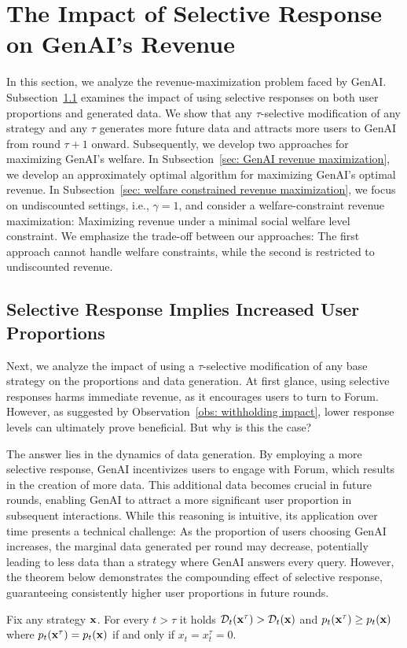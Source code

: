 \section{The Impact of Selective Response on GenAI's Revenue} \label{sec: genai effect}
In this section, we analyze the revenue-maximization problem faced by GenAI. Subsection~\ref{subsec:impact} examines the impact of using selective responses on both user proportions and generated data. We show that
any $\tau$-selective modification of any strategy and any $\tau$ generates more future data and attracts more users to GenAI from round $\tau+1$ onward. Subsequently, we develop two approaches for maximizing GenAI's welfare. In Subsection~\ref{sec: GenAI revenue maximization}, we develop an approximately optimal algorithm for maximizing GenAI's optimal revenue. In Subsection~\ref{sec: welfare constrained revenue maximization}, we focus on undiscounted settings, i.e., $\gamma=1$, and consider a welfare-constraint revenue maximization: Maximizing revenue under a minimal social welfare level constraint. We emphasize the trade-off between our approaches: The first approach cannot handle welfare constraints, while the second is restricted to undiscounted revenue. %

\subsection{Selective Response Implies Increased User Proportions}\label{subsec:impact}
Next, we analyze the impact of using a $\tau$-selective modification of any base strategy on the proportions and data generation. At first glance, using selective responses harms immediate revenue, as it encourages users to turn to Forum. However, as suggested by Observation~\ref{obs: withholding impact}, lower response levels can ultimately prove beneficial. But why is this the case?

The answer lies in the dynamics of data generation. By employing a more selective response, GenAI incentivizes users to engage with Forum, which results in the creation of more data. This additional data becomes crucial in future rounds, enabling GenAI to attract a more significant user proportion in subsequent interactions. While this reasoning is intuitive, its application over time presents a technical challenge: As the proportion of users choosing GenAI increases, the marginal data generated per round may decrease, potentially leading to less data than a strategy where GenAI answers every query. However, the theorem below demonstrates the compounding effect of selective response, guaranteeing consistently higher user proportions in future rounds.
\begin{theorem} \label{thm: not answering increase proportions}
Fix any strategy ${\bf{x}}$. For every $t > \tau$ it holds $\mathcal{D}_t({\bf{x}}^\tau) > \mathcal{D}_t({\bf{x}})$ and $p_t({\bf{x}}^\tau) \geq p_t({\bf{x}})$ where $p_t({\bf{x}}^\tau) = p_t({\bf{x}})$ if and only if $x_t = x_t^\tau= 0$.
\end{theorem}


